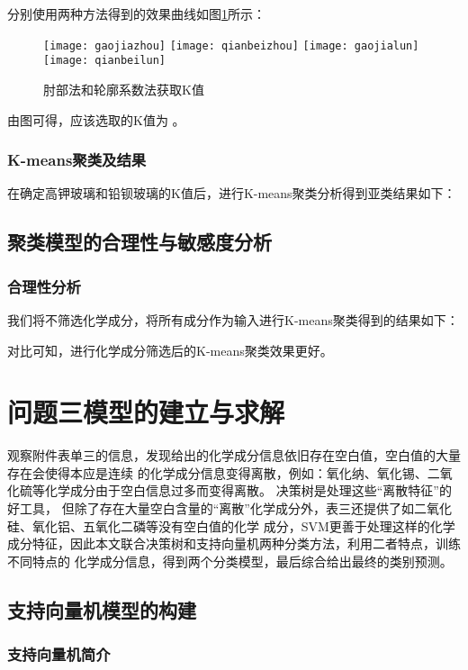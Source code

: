\documentclass[withoutpreface,bwprint]{cumcmthesis} %
\begin{document}
分别使用两种方法得到的效果曲线如图\ref{qdkz}所示：

\begin{figure}[!h]
	\centering
	\texttt{[image: gaojiazhou]}
	\texttt{[image: qianbeizhou]}
	\texttt{[image: gaojialun]}
	\texttt{[image: qianbeilun]}
	\caption{肘部法和轮廓系数法获取K值}
	\label{qdkz}
\end{figure}

由图可得，应该选取的K值为 。


\subsubsection{K-means聚类及结果}
在确定高钾玻璃和铅钡玻璃的K值后，进行K-means聚类分析得到亚类结果如下：

\subsection{聚类模型的合理性与敏感度分析}
\subsubsection{合理性分析}

我们将不筛选化学成分，将所有成分作为输入进行K-means聚类得到的结果如下：

对比可知，进行化学成分筛选后的K-means聚类效果更好。


\section{问题三模型的建立与求解}

观察附件表单三的信息，发现给出的化学成分信息依旧存在空白值，空白值的大量存在会使得本应是连续 的化学成分信息变得离散，例如：氧化纳、氧化锡、二氧化硫等化学成分由于空白信息过多而变得离散。 决策树是处理这些“离散特征”的好工具， 但除了存在大量空白含量的“离散”化学成分外，表三还提供了如二氧化硅、氧化铝、五氧化二磷等没有空白值的化学 成分，SVM更善于处理这样的化学成分特征，因此本文联合决策树和支持向量机两种分类方法，利用二者特点，训练不同特点的 化学成分信息，得到两个分类模型，最后综合给出最终的类别预测。

\subsection{支持向量机模型的构建}

\subsubsection{支持向量机简介}
\end{document}
